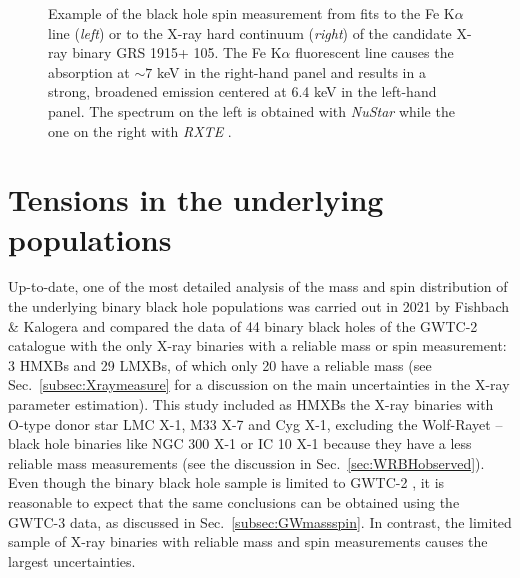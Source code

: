 \documentclass[a4paper,titlepage]{book}     	%
\begin{document}
\begin{figure}
\begin{minipage}{.49\textwidth}
	\end{minipage}
	\caption{Example of the black hole spin measurement from fits to the Fe K$\alpha$ line (\emph{left}) or to the X-ray hard continuum (\emph{right}) of the candidate X-ray binary GRS 1915+ 105. The Fe K$\alpha$ fluorescent line causes the absorption at $\sim 7$ keV in the right-hand panel and results in a strong, broadened emission centered at 6.4 keV in the left-hand panel. The spectrum on the left is obtained with \textit{NuStar} while the one on the right with \textit{RXTE} \cite{GSR1915_lowhardXstate}.}\label{fig:spinmeasure}
\end{figure}


\section{Tensions in the underlying populations}\label{sec:tensionmassspin2021}
Up-to-date, one of the most detailed analysis of the mass and spin distribution of the underlying binary black hole populations was carried out in 2021 by Fishbach \& Kalogera \cite{HMXBH_spins2021} and compared the data of 44 binary black holes of the GWTC-2 catalogue with the only X-ray binaries with a reliable mass or spin measurement: 3 HMXBs and 29 LMXBs, of which only 20 have a reliable mass (see Sec.\ \ref{subsec:Xraymeasure} for a discussion on the main uncertainties in the X-ray parameter estimation). This study included as HMXBs the X-ray binaries with O-type donor star LMC X-1, M33 X-7 and Cyg X-1, excluding the Wolf-Rayet -- black hole binaries like NGC 300 X-1 or IC 10 X-1 because they have a less reliable mass measurements \cite{ICX10X-1_Laycock2015_revisited} (see the discussion in Sec.\ \ref{sec:WRBHobserved}). Even though the binary black hole sample is limited to GWTC-2 \cite{GWTC-2}, it is reasonable to expect that the same conclusions can be obtained using the GWTC-3 data, as discussed in Sec.\ \ref{subsec:GWmassspin}. In contrast, the limited sample of X-ray binaries with reliable mass and spin measurements causes the largest uncertainties.
\end{document}
